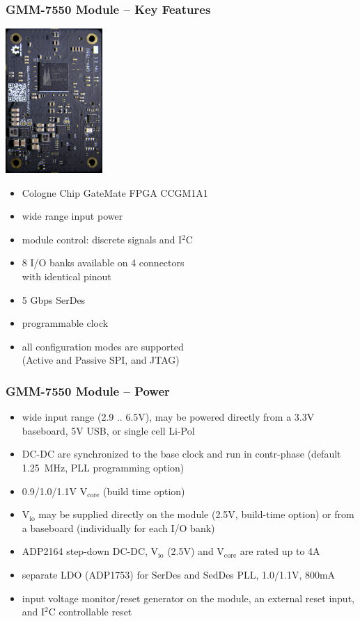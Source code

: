 \begin{frame}
  \frametitle{GMM-7550 Module -- Key Features}

  \begin{flushright}
    \includegraphics[height=5.5cm]{gmm7550.jpg}
  \end{flushright}
  \vspace{-5.5cm}

  \begin{minipage}{9cm}
  \begin{itemize}
  \item Cologne Chip GateMate FPGA CCGM1A1
  \item wide range input power
  \item module control: discrete signals and I$^2$C
  \item 8 I/O banks available on 4 connectors\\with identical pinout
  \item 5 Gbps SerDes
  \item programmable clock
  \item all configuration modes are supported\\(Active and Passive SPI,
  and JTAG)
  \end{itemize}
  \end{minipage}
\end{frame}

\begin{frame}
  \frametitle{GMM-7550 Module -- Power}
  \begin{itemize}
  \item wide input range (2.9 .. 6.5V), may be powered directly from a
  3.3V baseboard, 5V USB, or single cell Li-Pol
  \item DC-DC are synchronized to the base clock and run in
  contr-phase (default 1.25~MHz, PLL programming option)
  \item 0.9/1.0/1.1V V$_{\text{core}}$ (build time option)
  \item V$_{\text{io}}$ may be supplied directly on the module (2.5V, build-time
  option) or from\\a baseboard (individually for each I/O bank)
  \item ADP2164 step-down DC-DC, V$_{\text{io}}$ (2.5V) and V$_{\text{core}}$ are rated up to 4A
  \item separate LDO (ADP1753) for SerDes and SedDes PLL, 1.0/1.1V, 800mA
  \item input voltage monitor/reset generator on the module, an
  external reset input, and I$^2$C controllable reset
  \end{itemize}
\end{frame}

